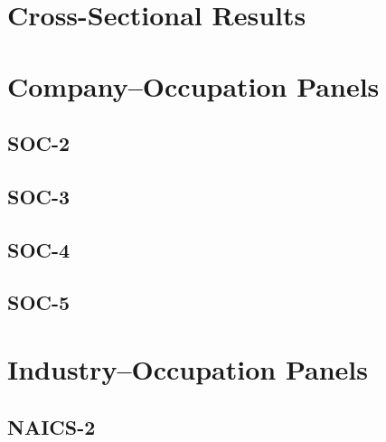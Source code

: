 \documentclass{article}
\begin{document}
\section*{Cross-Sectional Results}


\section*{Company--Occupation Panels}

\subsection*{SOC-2}


\subsection*{SOC-3}


\subsection*{SOC-4}


\subsection*{SOC-5}


\section*{Industry--Occupation Panels}

\subsection*{NAICS-2}




\end{document}
